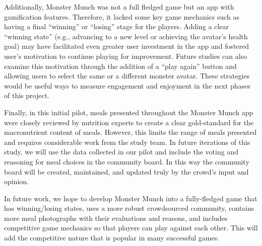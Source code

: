 Additionally, Monster Munch was not a full fledged game but an app with gamification features. Therefore, it lacked some key game mechanics such as having a final ``winning'' or ``losing'' stage for the players. Adding a clear ``winning state'' (e.g., advancing to a new level or achieving the avatar's health goal) may have facilitated even greater user investment in the app and fostered user's motivation to continue playing for improvement. 
Future studies can also examine this motivation through the addition of a ``play again'' button and allowing users to select the same or a different monster avatar. 
These strategies would be useful ways to measure engagement and enjoyment in the next phases of this project.  

Finally, in this initial pilot, meals presented throughout the Monster Munch app were closely reviewed by nutrition experts to create a clear gold-standard for the macronutrient content of meals. 
However, this limits the range of meals presented and requires considerable work from the study team. In future iterations of this study, we will use the data collected in our pilot and include the voting and reasoning for meal choices in the community board. In this way the community board will be created, maintained, and updated truly by the crowd's input and opinion.  

In future work, we hope to develop Monster Munch into a fully-fledged game that has winning/losing states, uses a more robust crowdsourced community, contains more meal photographs with their evaluations and reasons, and includes competitive game mechanics so that players can play against each other.  
This will add the competitive nature that is popular in many successful games. 





